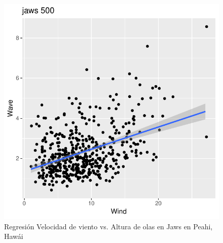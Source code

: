 %     
%     
%     


\begin{figure}[H]
    \centering
    \includegraphics{./figures/jaws_500_lmFit.pdf}
    \caption{Regresión Velocidad de viento vs. Altura de olas en Jaws en Peahi, Hawái}
    \label{fig:wind_waves_jaws_fit}
\end{figure}

